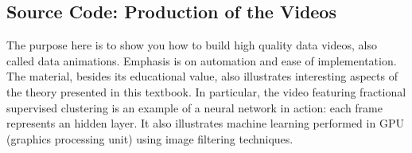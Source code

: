 \documentclass[10pt]{article}
\begin{document}
\subsection{Source Code: Production of the Videos}\label{visusc}

The purpose here is to show you how to build high quality data videos, also called data animations. Emphasis is on automation and ease of implementation. 
The material, besides its educational value, also illustrates interesting aspects of the theory presented in this textbook. In particular, the video featuring 
fractional supervised clustering is an example of a neural network in action: each frame represents an hidden layer. It also illustrates machine learning performed in GPU (graphics processing unit) using image filtering techniques.
\end{document}
